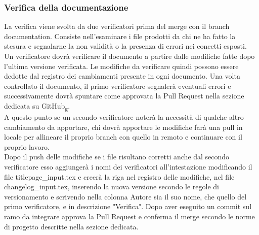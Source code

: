 \subsubsection{Verifica della documentazione}
La verifica viene svolta da due verificatori prima del merge con il branch documentation.
Consiste nell'esaminare i file prodotti da chi ne ha fatto la stesura e segnalarne la non validità o 
la presenza di errori nei concetti esposti.\\
Un verificatore dovrà verificare il documento a partire dalle modifiche fatte dopo l'ultima versione verificata.
Le modifiche da verificare quindi possono essere dedotte dal registro dei cambiamenti presente in ogni documento.
Una volta controllato il documento, il primo verificatore segnalerà eventuali errori e
successivamente dovrà spuntare come approvata la Pull Request nella sezione dedicata su GitHub\textsubscript{g}. \\
A questo punto se un secondo verificatore noterà la necessità di qualche altro cambiamento da apportare, chi dovrà apportare le modifiche farà una pull in locale per
allineare il proprio branch con quello in remoto e continuare con il proprio lavoro.\\
Dopo il push delle modifiche se i file risultano corretti anche dal secondo verificatore esso aggiungerà i nomi dei verificatori all'intestazione modificando il file titlepage\_input.tex
 e creerà la riga nel registro delle modifiche, nel file changelog\_input.tex,  inserendo la nuova versione secondo le regole di versionamento e scrivendo nella colonna Autore sia il suo nome,
che quello del primo verificatore, e in descrizione "Verifica".
Dopo aver eseguito un commit sul ramo da integrare approva la Pull Request e conferma il merge secondo le norme di progetto descritte nella sezione dedicata.